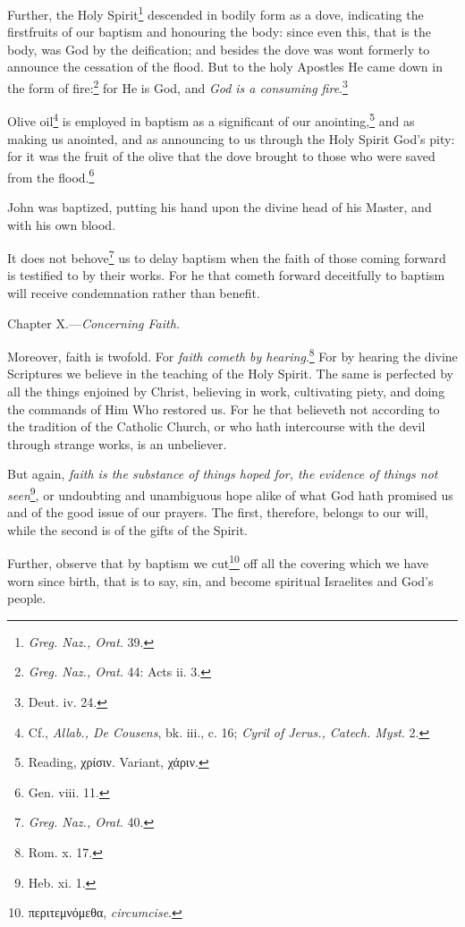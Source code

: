 Further, the Holy Spirit\footnote{\emph{Greg. Naz., Orat}. 39.} descended in bodily form as a dove, indicating the firstfruits of our baptism and honouring the body: since even this, that is the body, was God by the deification; and besides the dove was wont formerly to announce the cessation of the flood. But to the holy Apostles He came down in the form of fire:\footnote{\emph{Greg. Naz., Orat}. 44: Acts ii. 3.} for He is God, and \emph{God is a consuming fire}.\footnote{Deut. iv. 24.}

Olive oil\footnote{Cf., \emph{Allab., De Cousens}, bk. iii., c. 16; \emph{Cyril of Jerus., Catech. Myst}. 2.} is employed in baptism as a significant of our anointing,\footnote{Reading, \textgreek{χρίσιν}. Variant, \textgreek{χάριν}.} and as making us anointed, and as announcing to us through the Holy Spirit God’s pity: for it was the fruit of the olive that the dove brought to those who were saved from the flood.\footnote{Gen. viii. 11.}

John was baptized, putting his hand upon the divine head of his Master, and with his own blood.

It does not behove\footnote{\emph{Greg. Naz., Orat}. 40.} us to delay baptism when the faith of those coming forward is testified to by their works. For he that cometh forward deceitfully to baptism will receive condemnation rather than benefit.


Chapter X.—\emph{Concerning Faith.}

Moreover, faith is twofold. For \emph{faith cometh by hearing}.\footnote{Rom. x. 17.} For by hearing the divine Scriptures we believe in the teaching of the Holy Spirit. The same is perfected by all the things enjoined by Christ, believing in work, cultivating piety, and doing the commands of Him Who restored us. For he that believeth not according to the tradition of the Catholic Church, or who hath intercourse with the devil through strange works, is an unbeliever.

But again, \emph{faith is the substance of things hoped for, the evidence of things not seen}\footnote{Heb. xi. 1.}, or undoubting and unambiguous hope alike of what God hath promised us and of the good issue of our prayers. The first, therefore, belongs to our will, while the second is of the gifts of the Spirit.

Further, observe that by baptism we cut\footnote{\textgreek{περιτεμνόμεθα}, \emph{circumcise}.} off all the covering which we have worn since birth, that is to say, sin, and become spiritual Israelites and God’s people.

